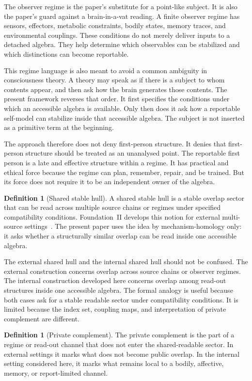 \documentclass[12pt]{article}
\theoremstyle{definition}
\newtheorem{definition}[proposition]{Definition}
\theoremstyle{remark}
\begin{document}
The observer regime is the paper's substitute for a point-like subject.
It is also the paper's guard against a brain-in-a-vat reading. A finite
observer regime has sensors, effectors, metabolic constraints, bodily
states, memory traces, and environmental couplings. These conditions do
not merely deliver inputs to a detached algebra. They help determine
which observables can be stabilized and which distinctions can become
reportable.

This regime language is also meant to avoid a common ambiguity in
consciousness theory. A theory may speak as if there is a subject to
whom contents appear, and then ask how the brain generates those
contents. The present framework reverses that order. It first specifies
the conditions under which an accessible algebra is available. Only
then does it ask how a reportable self-model can stabilize inside that
accessible algebra. The subject is not inserted as a primitive term at
the beginning.

The approach therefore does not deny first-person structure. It denies
that first-person structure should be treated as an unanalysed point.
The reportable first person is a late and effective structure within a
regime. It has practical and ethical force because the regime can plan,
remember, repair, and be trained. But its force does not require it to
be an independent owner of the algebra.

\begin{definition}[Shared stable hull]
A shared stable hull is a stable overlap sector that can be read across
multiple source chains or regimes under specified compatibility
conditions. Foundation~II develops this notion for external
multi-source settings~\cite{FoundationII}. The present paper uses the
idea by mechanism-homology only: it asks whether a structurally similar
overlap can be read inside one accessible algebra.
\end{definition}

The external shared hull and the internal shared hull should not be
confused. The external construction concerns overlap across source
chains or observer regimes. The internal construction developed here
concerns overlap among read-out structures inside one accessible
algebra. The formal analogy is useful because both cases ask for a
stable readable sector under compatibility conditions. It is limited
because the index set, coupling maps, and interpretation of private
complement are different.

\begin{definition}[Private complement]
The private complement is the part of a regime or read-out channel that
does not enter the shared-readable sector. In external settings it marks
what does not become public overlap. In the internal setting considered
here, it marks what remains local to a bodily, affective, memory, or
report-limited channel.
\end{definition}
\end{document}
